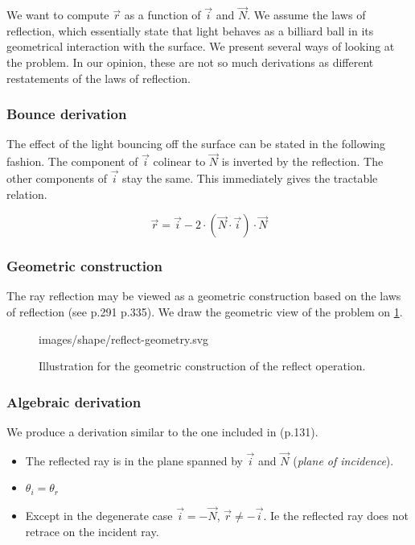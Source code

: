 We want to compute $\overrightarrow{r}$ as a function of $\overrightarrow{i}$
and $\overrightarrow{N}$.  We assume the laws of reflection, which essentially
state that light behaves as a billiard ball in its geometrical interaction with
the surface.  We present several ways of looking at the problem. In our
opinion, these are not so much derivations as different restatements of the
laws of reflection.

\subsubsection{Bounce derivation}
The effect of the light bouncing off the surface can be stated in the following
fashion. The component of $\overrightarrow{i}$ colinear to $\overrightarrow{N}$
is inverted by the reflection. The other components of $\overrightarrow{i}$ stay
the same. This immediately gives the tractable relation.

\begin{equation}
\overrightarrow{r} = \overrightarrow{i} - 2 \cdot (\overrightarrow{N} \cdot
\overrightarrow{i}) \cdot \overrightarrow{N}
\end{equation}

\subsubsection{Geometric construction}
The ray reflection may be viewed as a geometric construction based on the
laws of reflection (see \cite{Glassner:1989} p.291 \cite{Comninos:2010}
p.335). We draw the geometric view of the problem on
\cref{fig:reflect-geometry}.

\begin{figure} \caption{\label{fig:reflect-geometry} Illustration for the
geometric construction of the reflect operation.}

           {images/shape/reflect-geometry.svg}
\end{figure}

\subsubsection{Algebraic derivation}
We produce a derivation similar to the one included in \cite{Glassner:1989}
(p.131).

\begin{itemize}
\item The reflected ray is in the plane spanned by $\overrightarrow{i}$ and
      $\overrightarrow{N}$ (\emph{plane of incidence}).
\item $\theta_i = \theta_r$
\item Except in the degenerate case $\overrightarrow{i} = - \overrightarrow{N}$,
$\overrightarrow{r} \neq - \overrightarrow{i}$. Ie the reflected ray does not
retrace on the incident ray.
\end{itemize}

